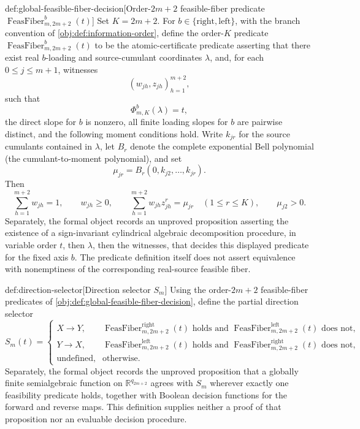 \documentclass[11pt]{article}
\begin{document}
\begin{definitionv}{def:global-feasible-fiber-decision}[Order-\(2m+2\) feasible-fiber predicate \(\operatorname{FeasFiber}^{b}_{m,2m+2}(t)\)]
Set \(K=2m+2\). For \(b\in\{\mathrm{right},\mathrm{left}\}\), with the branch convention of \cref{obj:def:information-order}, define the order-\(K\) predicate \(\operatorname{FeasFiber}^{b}_{m,2m+2}(t)\) to be the atomic-certificate predicate asserting that there exist real \(b\)-loading and source-cumulant coordinates \(\lambda\), and, for each \(0\leq j\leq m+1\), witnesses
\[
(w_{jh},z_{jh})_{h=1}^{m+2},
\]
such that
\[
\Phi^b_{m,K}(\lambda)=t,
\]
the direct slope for \(b\) is nonzero, all finite loading slopes for \(b\) are pairwise distinct, and the following moment conditions hold. Write \(k_{jr}\) for the source cumulants contained in \(\lambda\), let \(B_r\) denote the complete exponential Bell polynomial (the cumulant-to-moment polynomial), and set
\[
\mu_{jr}=B_r(0,k_{j2},\ldots,k_{jr}).
\]
Then
\[
\sum_{h=1}^{m+2} w_{jh}=1,\qquad
w_{jh}\geq 0,\qquad
\sum_{h=1}^{m+2} w_{jh}z_{jh}^r=\mu_{jr}\quad(1\leq r\leq K),
\qquad
\mu_{j2}>0.
\]
Separately, the formal object records an unproved proposition asserting the existence of a sign-invariant cylindrical algebraic decomposition procedure, in variable order \(t\), then \(\lambda\), then the witnesses, that decides this displayed predicate for the fixed axis \(b\). The predicate definition itself does not assert equivalence with nonemptiness of the corresponding real-source feasible fiber.
\end{definitionv}

\begin{definitionv}{def:direction-selector}[Direction selector \(S_m\)]
Using the order-\(2m+2\) feasible-fiber predicates of \cref{obj:def:global-feasible-fiber-decision}, define the partial direction selector
\[
S_m(t)=
\begin{cases}
X\to Y,&\operatorname{FeasFiber}^{\mathrm{right}}_{m,2m+2}(t)\text{ holds and }\operatorname{FeasFiber}^{\mathrm{left}}_{m,2m+2}(t)\text{ does not},\\
Y\to X,&\operatorname{FeasFiber}^{\mathrm{left}}_{m,2m+2}(t)\text{ holds and }\operatorname{FeasFiber}^{\mathrm{right}}_{m,2m+2}(t)\text{ does not},\\
\text{undefined},&\text{otherwise}.
\end{cases}
\]
Separately, the formal object records the unproved proposition that a globally finite semialgebraic function on \(\mathbb R^{q_{2m+2}}\) agrees with \(S_m\) wherever exactly one feasibility predicate holds, together with Boolean decision functions for the forward and reverse maps. This definition supplies neither a proof of that proposition nor an evaluable decision procedure.
\end{definitionv}
\end{document}
